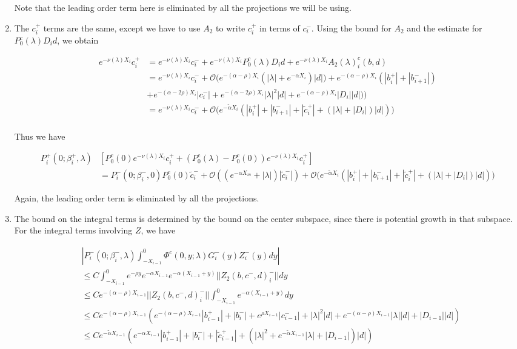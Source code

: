 \documentclass[12pt]{article}
\begin{document}
\begin{enumerate}
Note that the leading order term here is eliminated by all the projections we will be using.

\item The $c_i^+$ terms are the same, except we have to use $A_2$ to write $c_i^+$ in terms of $c_i^-$. Using the bound for $A_2$ and the estimate for $P_0^c(\lambda) D_i d$, we obtain 

\begin{align*}
e^{-\nu(\lambda)X_i} c_i^+ &= e^{-\nu(\lambda)X_i} c_i^- 
+ e^{-\nu(\lambda)X_i} P_0^c(\lambda) D_i d + e^{-\nu(\lambda)X_i} A_2(\lambda)_i^c(b, d)\\
&= e^{-\nu(\lambda)X_i} c_i^- + \mathcal{O}\Big( e^{-(\alpha - \rho) X_i} ( |\lambda| + e^{-\alpha X_i} ) |d|) + e^{-(\alpha - \rho) X_i} (|b_i^+| + |b_{i+1}^-|) \\
&+ e^{-(\alpha - 2 \rho) X_i} |c_i^-| + e^{-(\alpha - 2 \rho) X_i} |\lambda|^2|d| + e^{-(\alpha - \rho) X_i} |D_i||d| ) \Big) \\
&= e^{-\nu(\lambda)X_i} c_i^- + \mathcal{O}\Big( e^{-\tilde{\alpha} X_i} ( |b_i^+| + |b_{i+1}^-| + |\tilde{c}_i^+| + (|\lambda| + |D_i| ) |d|) \Big) \\
\end{align*}

Thus we have

\begin{align*}
P_i^+(0; \beta_i^+, \lambda)&[ P_0^c(0) e^{-\nu(\lambda) X_i} c_i^+ + (P_0^c(\lambda) - P_0^c(0)) e^{-\nu(\lambda) X_i} c_i^+] \\
&= P_i^-(0; \beta_i^-, 0) P_0^c(0) \tilde{c}_i^- + \mathcal{O}((e^{-\alpha X_m} + |\lambda|)|\tilde{c}_i^-|)
+ \mathcal{O}\Big( e^{-\tilde{\alpha} X_i} ( |b_i^+| + |b_{i+1}^-| + |\tilde{c}_i^+| + (|\lambda| + |D_i| ) |d|) \Big)
\end{align*}

Again, the leading order term is eliminated by all the projections.

\item The bound on the integral terms is determined by the bound on the center subspace, since there is potential growth in that subspace. For the integral terms involving $Z$, we have

\begin{align*}
&\left| P_i^-(0; \beta_i^-, \lambda) \int_{-X_{i-1}}^0 \Phi^c(0, y; \lambda) G_i^-(y) Z_i^-(y) dy \right| \\
&\leq C \int_{-X_{i-1}}^0 e^{-\rho y} e^{-\alpha X_{i-1}} e^{-\alpha(X_{i-1} + y) } ||Z_2(b, c^-, d)_i^-|| dy \\
&\leq C e^{-(\alpha - \rho) X_{i-1}} ||Z_2(b, c^-, d)_i^-|| \int_{-X_{i-1}}^0 e^{-\alpha(X_{i-1} + y) } dy \\
&\leq C e^{-(\alpha - \rho) X_{i-1}} ( e^{-(\alpha - \rho) X_{i-1}} |b_{i-1}^+| + |b_i^-| + e^{\rho X_{i-1}}|c_{i-1}^-| 
+ |\lambda|^2 |d| + e^{-(\alpha - \rho)X_{i-1}}|\lambda||d| + |D_{i-1}||d| ) \\
&\leq C e^{-\tilde{\alpha} X_{i-1}} \left( e^{-\alpha X_{i-1}} |b_{i-1}^+| + |b_i^-| + |\tilde{c}_{i-1}^+| + (|\lambda|^2 + e^{-\tilde{\alpha} X_{i-1}}|\lambda| + |D_{i-1}|) |d| \right)
\end{align*}


\end{enumerate}
\end{document}
